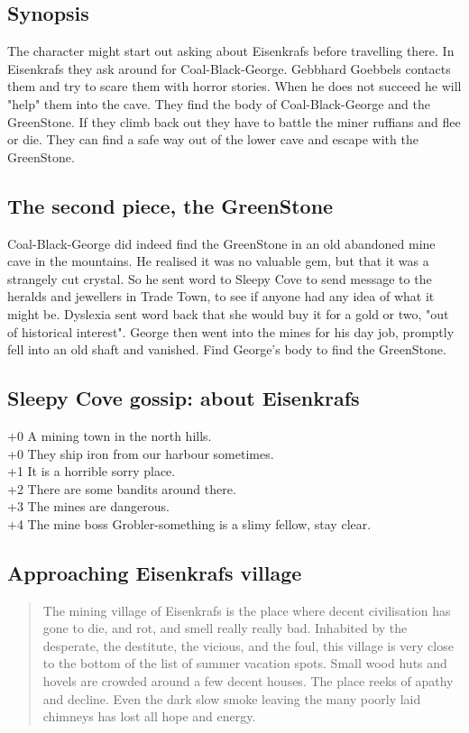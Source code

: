 \documentclass[11pt, twoside, titlepage, a4paper]{report}
\newenvironment{readoutloud}%
{\begin{quote}\begin{itshape}}%
{\end{itshape}\end{quote}}%
\begin{document}
\subsection*{Synopsis}
The character might start out asking about Eisenkrafs before travelling there. In Eisenkrafs they ask around for Coal-Black-George. Gebbhard Goebbels contacts them and try to scare them with horror stories. When he does not succeed he will "help" them into the cave. They find the body of Coal-Black-George and the GreenStone. If they climb back out they have to battle the miner ruffians and flee or die. They can find a safe way out of the lower cave and escape with the GreenStone.


\subsection*{The second piece, the GreenStone}
Coal-Black-George did indeed find the GreenStone in an old abandoned mine cave in the mountains. He realised it was no valuable gem, but that it was a strangely cut crystal. So he sent word to Sleepy Cove to send message to the heralds and jewellers in Trade Town, to see if anyone had any idea of what it might be. Dyslexia sent word back that she would buy it for a gold or two, "out of historical interest". George then went into the mines for his day job, promptly fell into an old shaft and vanished. Find George's body to find the GreenStone.


\subsection*{Sleepy Cove gossip: about Eisenkrafs}
+0 A mining town in the north hills. \\
+0 They ship iron from our harbour sometimes. \\
+1 It is a horrible sorry place. \\
+2 There are some bandits around there. \\
+3 The mines are dangerous. \\
+4 The mine boss Grobler-something is a slimy fellow, stay clear. \\


\subsection*{Approaching Eisenkrafs village}
\begin{readoutloud}
The mining village of Eisenkrafs is the place where decent civilisation has gone to die, and rot, and smell really really bad. Inhabited by the desperate, the destitute, the vicious, and the foul, this village is very close to the bottom of the list of summer vacation spots. Small wood huts and hovels are crowded around a few decent houses. The place reeks of apathy and decline. Even the dark slow smoke leaving the many poorly laid chimneys has lost all hope and energy.
\end{readoutloud}
\end{document}
